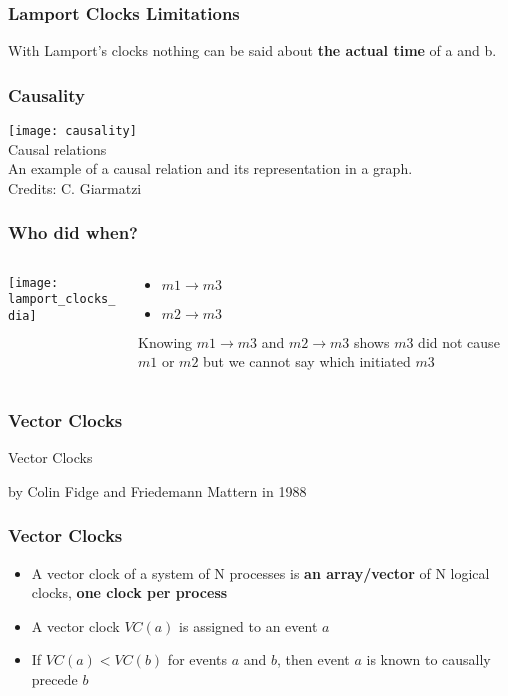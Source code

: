 \documentclass[aspectratio=169, 15pt,usenames,dvipsnames]{beamer}
\begin{document}
	\begin{gdblank}
		\frametitle{Lamport Clocks Limitations}
		\centering
		\LARGE
		With Lamport’s clocks nothing can be said about \textbf{the actual time} of a and b.
	\end{gdblank}
	\begin{gdblank}
		\frametitle{Causality} 
		\texttt{[image: causality]}
		\centering\\Causal relations\\An example of a causal relation and its representation in a graph. 
		\tiny \\Credits: C. Giarmatzi
	\end{gdblank}   
	\begin{gdblank}
		\frametitle{Who did when?}
		\begin{columns}
			\begin{column}{0.5\textwidth}
				\texttt{[image: lamport\_clocks\_dia]}			
			\end{column}
			\begin{column}{0.5\textwidth}
				\LARGE
				\begin{center}									
				\begin{minipage}{0.6\textwidth}
					\begin{itemize}
						\item $m1 \rightarrow m3$
						\item $m2 \rightarrow m3$ 
					\end{itemize}
				\end{minipage}
				\end{center}				
				\large
				Knowing $m1\rightarrow m3$ and $m2\rightarrow m3$ shows $m3$ did not cause $m1$ or $m2$ but we cannot say which initiated $m3$
			\end{column}	
		\end{columns}
	\end{gdblank}
	\begin{gdblank}
		\frametitle{Vector Clocks}
		\centering
		\LARGE
		Vector Clocks
		\par\large
		by Colin Fidge and Friedemann Mattern in 1988
	\end{gdblank}
	\begin{gdblank}
		\frametitle{Vector Clocks}
		\centering
		\large
		\begin{itemize}
			\item A vector clock of a system of N processes is \textbf{an array/vector} of N logical clocks, \textbf{one clock per process}
			\item A vector clock $VC(a)$ is assigned to an event $a$
			\item If $VC(a)<VC(b)$ for events $a$ and $b$, then event $a$ is known to causally precede $b$
		\end{itemize}
	\end{gdblank}
\end{document}
